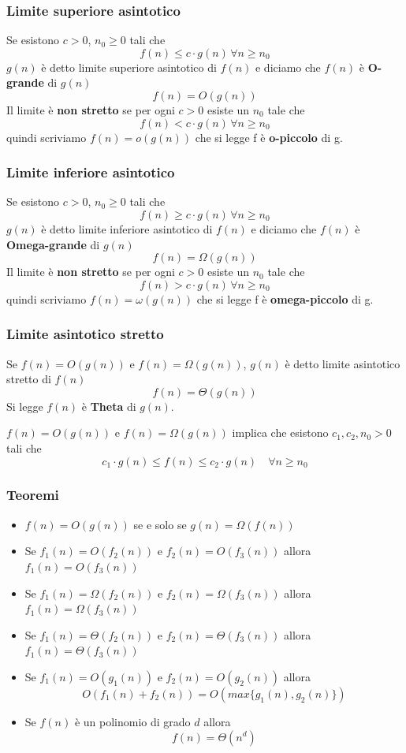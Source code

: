 \documentclass{article}
\begin{document}
\subsubsection*{Limite superiore asintotico}
Se esistono \(c > 0\), \(n_0 \geq 0\) tali che
\[f(n) \leq c \cdot g(n)\,\forall n \geq n_0\]
\(g(n)\) è detto limite superiore asintotico di \(f(n)\) e diciamo che \(f(n)\) è \textbf{O-grande} di \(g(n)\)
\[f(n) = O\left(g(n)\right)\]
Il limite è \textbf{non stretto} se per ogni \(c > 0\) esiste un \(n_0\) tale che
\[f(n) < c \cdot g(n)\,\forall n \geq n_0\]
quindi scriviamo \(f(n) = o\left(g(n)\right)\) che si legge f è \textbf{o-piccolo} di g.
\subsubsection*{Limite inferiore asintotico}
Se esistono \(c > 0\), \(n_0 \geq 0\) tali che
\[f(n) \geq c \cdot g(n)\,\forall n \geq n_0\]
\(g(n)\) è detto limite inferiore asintotico di \(f(n)\) e diciamo che \(f(n)\) è \textbf{Omega-grande} di \(g(n)\)
\[f(n) = \Omega\left(g(n)\right)\]
Il limite è \textbf{non stretto} se per ogni \(c > 0\) esiste un \(n_0\) tale che
\[f(n) > c \cdot g(n)\,\forall n \geq n_0\]
quindi scriviamo \(f(n) = \omega\left(g(n)\right)\) che si legge f è \textbf{omega-piccolo} di g.
\subsubsection*{Limite asintotico stretto}
Se \(f(n) = O\left(g(n)\right)\) e \(f(n) = \Omega\left(g(n)\right)\), \(g(n)\) è detto limite asintotico stretto di \(f(n)\)
\[f(n) = \Theta\left(g(n)\right)\]
Si legge \(f(n)\) è \textbf{Theta} di \(g(n)\).
\begin{oss}
  \(f(n) = O\left(g(n)\right)\) e \(f(n) = \Omega\left(g(n)\right)\) implica che esistono \(c_1, c_2, n_0 > 0\) tali che
  \[c_1 \cdot g(n) \leq f(n) \leq c_2 \cdot g(n) \quad \forall n \geq n_0\]
\end{oss}
\subsubsection*{Teoremi}
\begin{itemize}
  \item \(f(n) = O\left(g(n)\right)\) se e solo se \(g(n) = \Omega\left(f(n)\right)\)
  \item Se \(f_1(n) = O\left(f_2(n)\right)\) e \(f_2(n) = O\left(f_3(n)\right)\) allora \(f_1(n) = O\left(f_3 (n)\right)\)
  \item Se \(f_1(n) = \Omega\left(f_2(n)\right)\) e \(f_2(n) = \Omega\left(f_3(n)\right)\) allora \(f_1(n) = \Omega\left(f_3 (n)\right)\)
  \item Se \(f_1(n) = \Theta\left(f_2(n)\right)\) e \(f_2(n) = \Theta\left(f_3(n)\right)\) allora \(f_1(n) = \Theta\left(f_3 (n)\right)\)
  \item Se \(f_1(n) = O\left(g_1(n)\right)\) e \(f_2(n) = O\left(g_2(n)\right)\) allora \[O\left(f_1(n) + f_2(n)\right) = O\left(max\{g_1(n), g_2(n)\}\right)\]
  \item Se \(f(n)\) è un polinomio di grado \(d\) allora \[f(n) = \Theta\left(n^d\right)\]
\end{itemize}
\pagebreak
\end{document}
